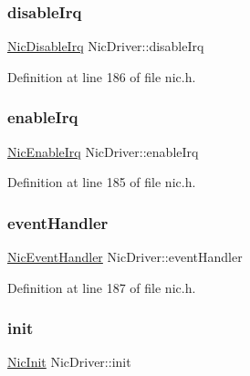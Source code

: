 \subsubsection{\texorpdfstring{disable\+Irq}{disableIrq}}
{\footnotesize\ttfamily \hyperlink{nic_8h_a2838a247e625bd72c8214dac1d95c394}{Nic\+Disable\+Irq} Nic\+Driver\+::disable\+Irq}



Definition at line 186 of file nic.\+h.

\mbox{\label{structNicDriver_ae8cd31c34ee241b0ad9756400b0ebb5f}} 
\subsubsection{\texorpdfstring{enable\+Irq}{enableIrq}}
{\footnotesize\ttfamily \hyperlink{nic_8h_a5287b4eea3f3d81a54e873acdf405c0f}{Nic\+Enable\+Irq} Nic\+Driver\+::enable\+Irq}



Definition at line 185 of file nic.\+h.

\mbox{\label{structNicDriver_a9f5931e1563daded83347864db7ec566}} 
\subsubsection{\texorpdfstring{event\+Handler}{eventHandler}}
{\footnotesize\ttfamily \hyperlink{nic_8h_a64cc7ec2ef61ae3a5c36c2d52f52ae0e}{Nic\+Event\+Handler} Nic\+Driver\+::event\+Handler}



Definition at line 187 of file nic.\+h.

\mbox{\label{structNicDriver_a9d158b20de0996ab27a34b3305f9b05d}} 
\subsubsection{\texorpdfstring{init}{init}}
{\footnotesize\ttfamily \hyperlink{nic_8h_a8c65f971bb6fede1efeae1873a16841f}{Nic\+Init} Nic\+Driver\+::init}



